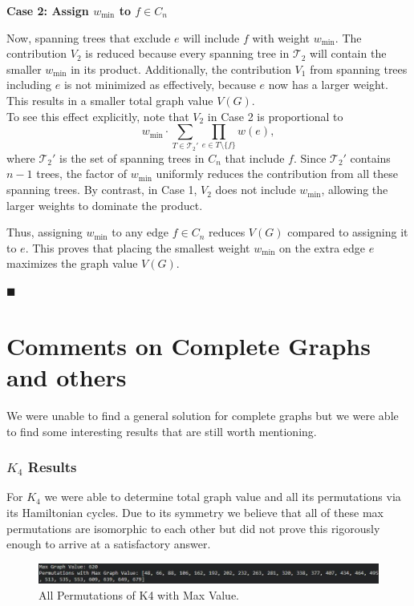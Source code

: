\documentclass[12pt,letterpaper]{article}
\begin{document}
\textbf{Case 2: Assign \( w_{\min} \) to \( f \in C_n \)}

Now, spanning trees that exclude \( e \) will include \( f \) with weight \( w_{\min} \). The contribution \( V_2 \) is reduced because every spanning tree in \( \mathcal{T}_2 \) will contain the smaller \( w_{\min} \) in its product. Additionally, the contribution \( V_1 \) from spanning trees including \( e \) is not minimized as effectively, because \( e \) now has a larger weight. This results in a smaller total graph value \( V(G) \).\\

To see this effect explicitly, note that \( V_2 \) in Case 2 is proportional to
\[
w_{\min} \cdot \sum_{T \in \mathcal{T}_2'} \prod_{e \in T \setminus \{f\}} w(e),
\]
where \( \mathcal{T}_2' \) is the set of spanning trees in \( C_n \) that include \( f \). Since \( \mathcal{T}_2' \) contains \( n-1 \) trees, the factor of \( w_{\min} \) uniformly reduces the contribution from all these spanning trees. By contrast, in Case 1, \( V_2 \) does not include \( w_{\min} \), allowing the larger weights to dominate the product.

Thus, assigning \( w_{\min} \) to any edge \( f \in C_n \) reduces \( V(G) \) compared to assigning it to \( e \). This proves that placing the smallest weight \( w_{\min} \) on the extra edge \( e \) maximizes the graph value \( V(G) \).

$\blacksquare$\\

\part{Comments on Complete Graphs and others} \label{Kn}

We were unable to find a general solution for complete graphs but we were able to find some interesting results that are still worth mentioning.

\section{$K_{4}$ Results}

For $K_{4}$ we were able to determine total graph value and all its permutations via its Hamiltonian cycles. Due to its symmetry we believe that all of these max permutations are isomorphic to each other but did not prove this rigorously enough to arrive at a satisfactory answer.

\begin{figure}[hbt!]  
    \begin{center}
    \includegraphics[width=6in]{f4.1.jpg}
    \caption{\label{last} All Permutations of K4 with Max Value.}
    \end{center}
	\end{figure}
  
\end{document}
